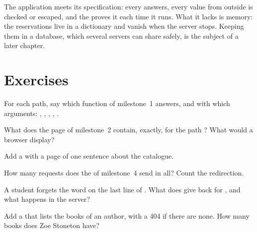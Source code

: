 The application meets its specification: every  answers, every value from outside is checked or escaped,
and the  proves it each time it runs. What it lacks is memory: the reservations live in a dictionary and
vanish when the server stops. Keeping them in a database, which several servers can share safely, is the subject of
a later chapter.

\section{Exercises}\label{sec:g10:project-web-application:exercises}

\begin{exercise}[$\star$]\label{exo:g10:project-web-application:1}
For each path, say which function of milestone~1 answers, and with which arguments: \code{/}, ,
, , .
\end{exercise}

\begin{exercise}[$\star$]\label{exo:g10:project-web-application:2}
What does the page of milestone~2 contain, exactly, for the path ? What would a browser display?
\end{exercise}

\begin{exercise}[$\star$]\label{exo:g10:project-web-application:3}
Add a   with a page of one sentence about the catalogue.
\end{exercise}

\begin{exercise}[$\star$]\label{exo:g10:project-web-application:4}
How many  requests does the  of milestone~4 send in all? Count the redirection.
\end{exercise}

\begin{exercise}[$\star$]\label{exo:g10:project-web-application:5}
A student forgets the word  on the last line of . What does  give back for
, and what happens in the server?
\end{exercise}

\begin{exercise}[$\star\star$]\label{exo:g10:project-web-application:6}
Add a   that lists the books of an author, with a 404 if there are none. How many books
does Zoe Stoneton have?
\end{exercise}

